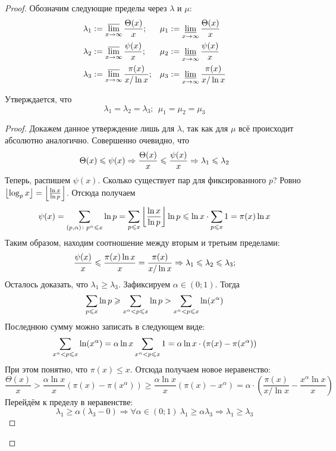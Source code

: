 \begin{proof}
	Обозначим следующие пределы через $\lambda$ и $\mu$:
	\begin{align*}
		&{\lambda_1 := \varlimsup\limits_{x \to \infty} \frac{\Theta(x)}{x};} & &{\mu_1 := \varliminf\limits_{x \to \infty} \frac{\Theta(x)}{x}} \\
		&{\lambda_2 := \varlimsup\limits_{x \to \infty} \frac{\psi(x)}{x};} & &{\mu_2 := \varliminf\limits_{x \to \infty} \frac{\psi(x)}{x}} \\
		&{\lambda_3 := \varlimsup\limits_{x \to \infty} \frac{\pi(x)}{x / \ln x};} & &{\mu_3 := \varliminf\limits_{x \to \infty} \frac{\pi(x)}{x / \ln x}}
	\end{align*}
	
	\begin{lemma}
		Утверждается, что
		\[
			\lambda_1 = \lambda_2 = \lambda_3;\ \ \mu_1 = \mu_2 = \mu_3
		\]
	\end{lemma}

	\begin{proof}
		Докажем данное утверждение лишь для $\lambda$, так как для $\mu$ всё происходит абсолютно аналогично. Совершенно очевидно, что
		\[
			\Theta(x) \leqslant \psi(x) \Rightarrow \frac{\Theta(x)}{x} \leqslant \frac{\psi(x)}{x} \Rightarrow \lambda_1 \leqslant \lambda_2
		\]
		Теперь, распишем $\psi(x)$. Сколько существует пар для фиксированного $p$? Ровно $\left\lfloor \log_p x \right\rfloor = \left\lfloor \frac{\ln x}{\ln p} \right\rfloor$. Отсюда получаем
		\[
			\psi(x) = \sum\limits_{(p, \alpha) \colon p^\alpha \leqslant x} \ln p = \sum\limits_{p \leqslant x} \left\lfloor \frac{\ln x}{\ln p} \right\rfloor \ln p \leqslant \ln x \cdot \sum\limits_{p \leqslant x} 1 = \pi(x) \ln x
		\]
		Таким образом, находим соотношение между вторым и третьим пределами:
		\[
		 	\frac{\psi(x)}{x} \leqslant \frac{\pi(x) \ln x}{x} = \frac{\pi(x)}{x / \ln x} \Rightarrow \lambda_1 \leqslant \lambda_2 \leqslant \lambda_3;
		\]
		Осталось доказать, что $\lambda_1 \ge \lambda_3$. Зафиксируем $\alpha \in (0; 1)$. Тогда
		\[
			\sum\limits_{p \leqslant x} \ln p \geqslant \sum\limits_{x^\alpha < p \leqslant x} \ln p > \sum\limits_{x^\alpha < p \leqslant x} \ln (x^\alpha)
		\]
		Последнюю сумму можно записать в следующем виде:
		\[
			\sum\limits_{x^\alpha < p \leqslant x} \ln (x^\alpha) = \alpha \ln x \sum\limits_{x^\alpha < p \leqslant x} 1 = \alpha \ln x \cdot (\pi(x) - \pi(x^\alpha))
		\]
		При этом понятно, что $\pi(x) \le x$. Отсюда получаем новое неравенство:
		\[
			\frac{\Theta(x)}{x} > \frac{\alpha \ln x}{x} (\pi(x) - \pi(x^\alpha)) \ge \frac{\alpha \ln x}{x}(\pi(x) - x^\alpha) = \alpha \cdot \left(\frac{\pi(x)}{x / \ln x} - \frac{x^\alpha \ln x}{x}\right)
		\]
		Перейдём к пределу в неравенстве:
		\[
			\lambda_1 \ge \alpha (\lambda_3 - 0) \Longrightarrow \forall \alpha \in (0; 1)\ \lambda_1 \ge \alpha \lambda_3 \Longrightarrow \lambda_1 \ge \lambda_3
		\]
	\end{proof}


\end{proof}
